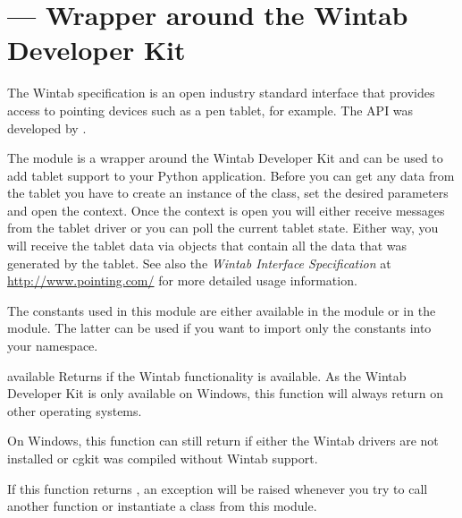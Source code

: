 \section{ ---
          Wrapper around the Wintab{\texttrademark} Developer Kit}


The Wintab{\texttrademark} specification is an open industry standard
interface that provides access to pointing devices such as a pen
tablet, for example. The API was developed by
.

The  module is a wrapper around the
Wintab{\texttrademark} Developer Kit and can be used to add tablet
support to your Python application. Before you can get any data from
the tablet you have to create an instance of the 
class, set the desired parameters and open the context. Once the
context is open you will either receive messages from the tablet
driver or you can poll the current tablet state. Either way, you will
receive the tablet data via  objects that contain all
the data that was generated by the tablet. See also the {\em Wintab
Interface Specification} at \url{http://www.pointing.com/} for more
detailed usage information.

The constants used in this module are either available in the 
 module or in the  module.
The latter can be used if you want to import only the constants into
your namespace.

\begin{funcdesc}{available}{}
Returns  if the Wintab functionality is available. As the Wintab
Developer Kit is only available on Windows, this function will always
return  on other operating systems. 

On Windows, this function can still return  if either the
Wintab drivers are not installed or cgkit was compiled without Wintab
support.

If this function returns , an exception will be raised
whenever you try to call another function or instantiate a class from
this module.
\end{funcdesc}

